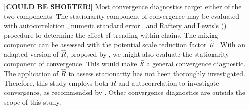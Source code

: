 \documentclass[article]{jss}
\begin{document}

\textbf{[COULD BE SHORTER!]} Most convergence diagnostics target either of the two components. The stationarity component of convergence may be evaluated with autocorrelation \citep[$AC$; ][]{scha97, gelm13}, numeric standard error \citep[or `MC error'; ][]{gewe92}, and Raftery and Lewis's (\citeyear{raft91}) procedure to determine the effect of trending within chains. The mixing component can be assessed with the potential scale reduction factor $\widehat{R}$ \citep[a.k.a. `Gelman-Rubin statistic';][]{gelm92}. With an adapted version of $\widehat{R}$, proposed by \cite{veht19}, we might also evaluate the stationarity component of convergence. This would make $\widehat{R}$ a general convergence diagnostic. The application of $\widehat{R}$ to assess stationarity has not been thoroughly investigated. Therefore, this study employs both $\widehat{R}$ and autocorrelation to investigate convergence, as recommended by \cite[p.~898]{cowl96}.
Other convergence diagnostics are outside the scope of this study.\footnotemark 
{}%
\end{document}
